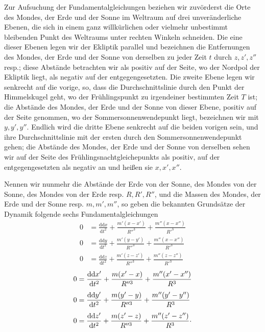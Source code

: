 \par\noindent\hspace*{\parindent}Zur Aufsuchung der Fundamentalgleichungen beziehen wir zuvörderst die
Orte des Mondes, der Erde und der Sonne im Weltraum auf drei unveränderliche
Ebenen, die sich in einem ganz willkürlichen oder vielmehr unbestimmt
bleibenden Punkt des Weltraums unter rechten Winkeln schneiden. Die eine
dieser Ebenen legen wir der Ekliptik parallel und bezeichnen die Entfernungen
des Mondes, der Erde und der Sonne von derselben zu jeder Zeit \(t\) durch
\(z,z',z''\) resp.; diese Abstände betrachten wir als positiv auf der Seite, wo
der Nordpol der Ekliptik liegt, als negativ auf der entgegengesetzten. Die
zweite Ebene legen wir senkrecht auf die vorige, so, dass die
Durchschnittslinie durch den Punkt der Himmelskugel geht, wo der Frühlingspunkt
zu irgendeiner bestimmten Zeit \(T\) ist; die Abstände des Mondes, der Erde und
der Sonne von dieser Ebene, positiv auf der Seite genommen, wo der
Sommersonnenwendepunkt liegt, bezeichnen wir mit \(y,y',y''\). Endlich wird die
dritte Ebene senkrecht auf die beiden vorigen sein, und ihre Durchschnittslinie
mit der ersten durch den Sommersonnenwendepunkt gehen; die Abstände des
Mondes, der Erde und der Sonne von derselben sehen wir auf der Seite des
Frühlingsnachtgleichepunkts als positiv, auf der entgegengesetzten als negativ
an und heißen sie \(x,x',x''\).

\par\noindent\hspace*{\parindent}Nennen wir nunmehr die Abstände der Erde von der Sonne, des Mondes von der
Sonne, des Mondes von der Erde resp. \(R,R',R''\), und die Massen des Mondes, der
Erde und der Sonne resp. \(m,m',m''\), so geben die bekannten Grundsätze der
Dynamik folgende sechs Fundamentalgleichungen
\[
\begin{aligned}
0&=\frac{\mathrm{dd}x}{\mathrm{d}t^2}
  +\frac{m'(x-x')}{R''^3}+\frac{m''(x-x'')}{R'^3}\\[4pt]
0&=\frac{\mathrm{dd}y}{\mathrm{d}t^2}
  +\frac{m'(y-y')}{R''^3}+\frac{m''(x-x'')}{R'^3}\\[4pt]
0&=\frac{\mathrm{dd}z}{\mathrm{d}t^2}
  +\frac{m'(z-z')}{R''^3}+\frac{m''(z-z'')}{R'^3}
\end{aligned}
\]
\[
\begin{aligned}
0&=\frac{\mathrm{dd}x'}{\mathrm{d}t^2}
  +\frac{m(x'-x)}{R''^3}+\frac{m''(x'-x'')}{R^3}\\[4pt]
0&=\frac{\mathrm{dd}y'}{\mathrm{d}t^2}
  +\frac{m(y'-y)}{R''^3}+\frac{m''(y'-y'')}{R^3}\\[4pt]
0&=\frac{\mathrm{dd}z'}{\mathrm{d}t^2}
  +\frac{m(z'-z)}{R''^3}+\frac{m''(z'-z'')}{R^3}
  \mathpunct{\raisebox{.4ex}{.}}
\end{aligned}
\]
\clearpage
\endgroup
